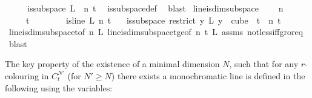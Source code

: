 \begin{isabellebody}
\isanewline
\ \ \isamarkupfalse%
\ \isamarkupfalse%
\ {\isachardoublequoteopen}is{\isacharunderscore}{\kern0pt}subspace\ {\isacharquery}{\kern0pt}L\ {}\ n\ t{\isachardoublequoteclose}\ \isamarkupfalse%
\ is{\isacharunderscore}{\kern0pt}subspace{\isacharunderscore}{\kern0pt}def\ \isamarkupfalse%
\ blast\isanewline
{}\isamarkupfalse%
%
\endisatagproof
{\isafoldproof}%
%
\isadelimproof
\isanewline
%
\endisadelimproof
\isanewline
{}\isamarkupfalse%
\ line{\isacharunderscore}{\kern0pt}is{\isacharunderscore}{\kern0pt}dim{}{\isacharunderscore}{\kern0pt}subspace{\isacharcolon}{\kern0pt}\ \isanewline
\ \ \ {\isachardoublequoteopen}n\ {\isachargreater}{\kern0pt}\ {}{\isachardoublequoteclose}\ \isanewline
\ \ \ \ \ {\isachardoublequoteopen}t\ {\isachargreater}{\kern0pt}\ {}{\isachardoublequoteclose}\ \isanewline
\ \ \ \ \ {\isachardoublequoteopen}is{\isacharunderscore}{\kern0pt}line\ L\ n\ t{\isachardoublequoteclose}\isanewline
\ \ \ {\isachardoublequoteopen}is{\isacharunderscore}{\kern0pt}subspace\ {\isacharparenleft}{\kern0pt}restrict\ {\isacharparenleft}{\kern0pt}{\isasymlambda}y{\isachardot}{\kern0pt}\ L\ {\isacharparenleft}{\kern0pt}y\ {}{\isacharparenright}{\kern0pt}{\isacharparenright}{\kern0pt}\ {\isacharparenleft}{\kern0pt}cube\ {}\ t{\isacharparenright}{\kern0pt}{\isacharparenright}{\kern0pt}\ {}\ n\ t{\isachardoublequoteclose}\isanewline
%
\isadelimproof
\ \ %
\endisadelimproof
%
\isatagproof
{}\isamarkupfalse%
\ line{\isacharunderscore}{\kern0pt}is{\isacharunderscore}{\kern0pt}dim{}{\isacharunderscore}{\kern0pt}subspace{\isacharunderscore}{\kern0pt}t{\isacharunderscore}{\kern0pt}{}{\isacharbrackleft}{\kern0pt}of\ n\ L{\isacharbrackright}{\kern0pt}\ line{\isacharunderscore}{\kern0pt}is{\isacharunderscore}{\kern0pt}dim{}{\isacharunderscore}{\kern0pt}subspace{\isacharunderscore}{\kern0pt}t{\isacharunderscore}{\kern0pt}ge{\isacharunderscore}{\kern0pt}{}{\isacharbrackleft}{\kern0pt}of\ n\ t\ L{\isacharbrackright}{\kern0pt}\ assms\ not{\isacharunderscore}{\kern0pt}less{\isacharunderscore}{\kern0pt}iff{\isacharunderscore}{\kern0pt}gr{\isacharunderscore}{\kern0pt}or{\isacharunderscore}{\kern0pt}eq\ \isamarkupfalse%
\ blast%
\endisatagproof
{\isafoldproof}%
%
\isadelimproof
%
\endisadelimproof
%
\begin{isamarkuptext}%
The key property of the existence of a minimal dimension $N$, such that for any
$r$-colouring in $C^{N'}_t$ (for $N' \geq N$) there exists a monochromatic line is defined in the
following using the variables:


\end{isamarkuptext}
\end{isabellebody}
